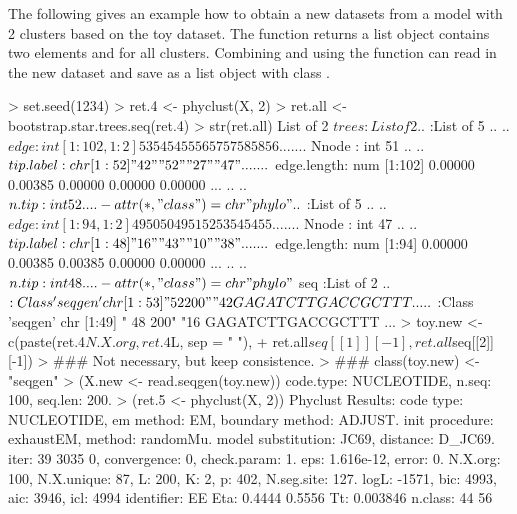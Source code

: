The following gives an example how to obtain a new datasets from a
model with 2 clusters based on the toy dataset.
The function  returns a list object
contains two elements  and  for all clusters.
Combining  and using the function  can
read in the new dataset and save as a list object with class
.
\begin{Code}
> set.seed(1234)
> ret.4 <- phyclust(X, 2)
> ret.all <- bootstrap.star.trees.seq(ret.4)
> str(ret.all)
List of 2
 $ trees:List of 2
  ..$ :List of 5
  .. ..$ edge       : int [1:102, 1:2] 53 54 54 55 56 57 57 58 58 56 ...
  .. ..$ Nnode      : int 51
  .. ..$ tip.label  : chr [1:52] "42" "52" "27" "47" ...
  .. ..$ edge.length: num [1:102] 0.00000 0.00385 0.00000 0.00000 0.00000 ...
  .. ..$ n.tip      : int 52
  .. ..- attr(*, "class")= chr "phylo"
  ..$ :List of 5
  .. ..$ edge       : int [1:94, 1:2] 49 50 50 49 51 52 53 54 54 55 ...
  .. ..$ Nnode      : int 47
  .. ..$ tip.label  : chr [1:48] "16" "43" "10" "38" ...
  .. ..$ edge.length: num [1:94] 0.00000 0.00385 0.00385 0.00000 0.00000 ...
  .. ..$ n.tip      : int 48
  .. ..- attr(*, "class")= chr "phylo"
 $ seq  :List of 2
  ..$ :Class 'seqgen'  chr [1:53] " 52 200" "42        GAGATCTTGACCGCTTT ...
  ..$ :Class 'seqgen'  chr [1:49] " 48 200" "16        GAGATCTTGACCGCTTT ...
> toy.new <- c(paste(ret.4$N.X.org, ret.4$L, sep = " "),
+              ret.all$seq[[1]][-1], ret.all$seq[[2]][-1])
> ### Not necessary, but keep consistence.
> ### class(toy.new) <- "seqgen"
> (X.new <- read.seqgen(toy.new))
code.type: NUCLEOTIDE, n.seq: 100, seq.len: 200.
> (ret.5 <- phyclust(X, 2))
Phyclust Results:
code type: NUCLEOTIDE, em method: EM, boundary method: ADJUST.
init procedure: exhaustEM, method: randomMu.
model substitution: JC69, distance: D_JC69.
iter: 39 3035 0, convergence: 0, check.param: 1.
eps: 1.616e-12, error: 0.
N.X.org: 100, N.X.unique: 87, L: 200, K: 2, p: 402, N.seg.site: 127.
logL: -1571, bic: 4993, aic: 3946, icl: 4994
identifier: EE
  Eta: 0.4444 0.5556 
  Tt: 0.003846 
  n.class: 44 56
\end{Code}

